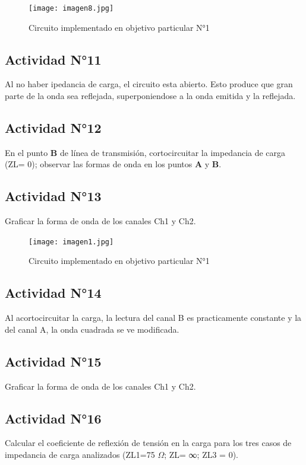\documentclass[12pt]{article}
\begin{document}
 \begin{figure}[hbt]
\centering
\texttt{[image: imagen8.jpg]}\\
\caption{Circuito implementado en objetivo particular N°1}
\label{Figura 1}
\end{figure}

\subsection{Actividad N°11}
 Al no haber ipedancia de carga, el circuito esta abierto. Esto produce que gran parte de la onda sea reflejada, superponiendose a la onda emitida y la reflejada.

\subsection{Actividad N°12}
 En el punto \textbf{B} de línea de transmisión, cortocircuitar la impedancia de carga (ZL= 0); observar las formas de onda en los puntos \textbf{A} y \textbf{B}.
 
\subsection{Actividad N°13}
 Graficar la forma de onda de los canales Ch1 y Ch2.
 \begin{figure}[hbt]
\centering
\texttt{[image: imagen1.jpg]}\\
\caption{Circuito implementado en objetivo particular N°1}
\label{Figura 1}
\end{figure}

\subsection{Actividad N°14}
 Al acortocircuitar la carga, la lectura del canal B es practicamente constante y la del canal A, la onda cuadrada se ve modificada.
\subsection{Actividad N°15}
 Graficar la forma de onda de los canales Ch1 y Ch2.
 
\subsection{Actividad N°16}
 Calcular el coeficiente de reflexión de tensión en la carga para los tres casos de impedancia de carga analizados (ZL1=75 $\Omega$; ZL= ∞; ZL3 = 0).
 
\end{document}

